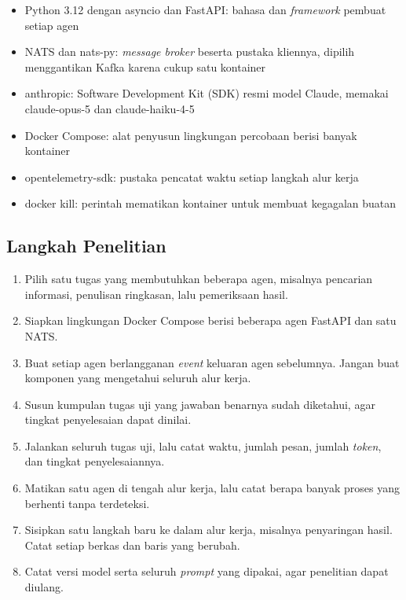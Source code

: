 \documentclass[11pt,a4paper]{article}
\begin{document}
\begin{itemize}[leftmargin=*]
  \item Python 3.12 dengan asyncio dan FastAPI: bahasa dan \textit{framework} pembuat setiap agen
  \item NATS dan nats-py: \textit{message broker} beserta pustaka kliennya, dipilih menggantikan Kafka karena cukup satu kontainer
  \item anthropic: Software Development Kit (SDK) resmi model Claude, memakai claude-opus-5 dan claude-haiku-4-5
  \item Docker Compose: alat penyusun lingkungan percobaan berisi banyak kontainer
  \item opentelemetry-sdk: pustaka pencatat waktu setiap langkah alur kerja
  \item docker kill: perintah mematikan kontainer untuk membuat kegagalan buatan
\end{itemize}

\subsection{Langkah Penelitian}

\begin{enumerate}[leftmargin=*]
  \item Pilih satu tugas yang membutuhkan beberapa agen, misalnya pencarian informasi, penulisan ringkasan, lalu pemeriksaan hasil.
  \item Siapkan lingkungan Docker Compose berisi beberapa agen FastAPI dan satu NATS.
  \item Buat setiap agen berlangganan \textit{event} keluaran agen sebelumnya. Jangan buat komponen yang mengetahui seluruh alur kerja.
  \item Susun kumpulan tugas uji yang jawaban benarnya sudah diketahui, agar tingkat penyelesaian dapat dinilai.
  \item Jalankan seluruh tugas uji, lalu catat waktu, jumlah pesan, jumlah \textit{token}, dan tingkat penyelesaiannya.
  \item Matikan satu agen di tengah alur kerja, lalu catat berapa banyak proses yang berhenti tanpa terdeteksi.
  \item Sisipkan satu langkah baru ke dalam alur kerja, misalnya penyaringan hasil. Catat setiap berkas dan baris yang berubah.
  \item Catat versi model serta seluruh \textit{prompt} yang dipakai, agar penelitian dapat diulang.
\end{enumerate}
\end{document}
